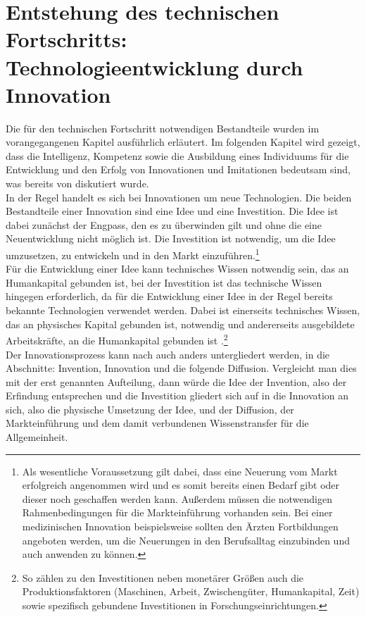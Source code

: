 \section[Technologieentwicklung durch Innovation]{Entstehung des technischen Fortschritts:\\Technologieentwicklung durch Innovation }
%
Die für den technischen Fortschritt notwendigen Bestandteile wurden im vorangegangenen Kapitel ausführlich erläutert. Im folgenden Kapitel wird gezeigt, dass die Intelligenz, Kompetenz sowie die Ausbildung eines Individuums für die Entwicklung und den Erfolg von Innovationen und Imitationen bedeutsam sind, was bereits von \cite{Hassler.2000} diskutiert wurde.\\
%
In der Regel handelt es sich bei Innovationen um neue Technologien. Die beiden Bestandteile einer Innovation sind eine Idee und eine Investition. Die Idee ist dabei zunächst der Engpass, den es zu überwinden gilt und ohne die eine Neuentwicklung nicht möglich ist. Die Investition ist notwendig, um die Idee umzusetzen, zu entwickeln und in den Markt einzuführen.\footnote{Als wesentliche Voraussetzung gilt dabei, dass eine Neuerung vom Markt erfolgreich angenommen wird und es somit bereits einen Bedarf gibt oder dieser noch geschaffen werden kann. Außerdem müssen die notwendigen Rahmenbedingungen für die Markteinführung vorhanden sein. Bei einer medizinischen Innovation beispielsweise sollten den Ärzten Fortbildungen angeboten werden, um die Neuerungen in den Berufsalltag einzubinden und auch anwenden zu können.}\\
%
Für die Entwicklung einer Idee kann technisches Wissen notwendig sein, das an Humankapital gebunden ist, bei der Investition ist das technische Wissen hingegen erforderlich, da für die Entwicklung einer Idee in der Regel bereits bekannte Technologien verwendet werden. Dabei ist einerseits technisches Wissen, das an physisches Kapital gebunden ist, notwendig und andererseits ausgebildete Arbeitskräfte, an die Humankapital gebunden ist \cite[S.39]{Scotchmer.2004}.\footnote{So zählen zu den Investitionen neben monetärer Größen auch die Produktionsfaktoren (Maschinen, Arbeit, Zwischengüter, Humankapital, Zeit) sowie spezifisch gebundene Investitionen in Forschungseinrichtungen.}\\
%
Der Innovationsprozess kann nach \cite{Jones.2005} auch anders untergliedert werden, in die Abschnitte: Invention, Innovation und die folgende Diffusion. Vergleicht man dies mit der erst genannten Aufteilung, dann würde die Idee der Invention, also der Erfindung entsprechen und die Investition gliedert sich auf in die Innovation an sich, also die physische Umsetzung der Idee, und der Diffusion, der Markteinführung und dem damit verbundenen Wissenstransfer für die Allgemeinheit.\\
